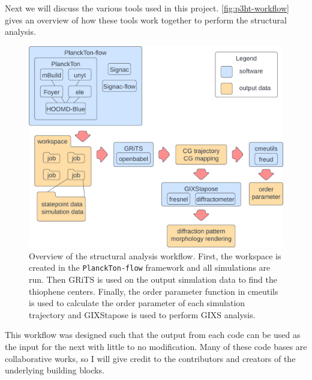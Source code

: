 Next we will discuss the various tools used in this project.  \autoref{fig:p3ht-workflow} gives an overview of how these tools work together to perform the structural analysis.
\begin{figure}[h!]
    \centering
    \includegraphics[width=0.8\linewidth]{figures/p3ht_val/workflow.png}
    \caption{Overview of the structural analysis workflow. First, the workspace is created in the \texttt{PlanckTon-flow} framework and all simulations are run. Then GRiTS is used on the output simulation data to find the thiophene centers. Finally, the order parameter function in cmeutils is used to calculate the order parameter of each simulation trajectory and GIXStapose is used to perform GIXS analysis.}\label{fig:p3ht-workflow}
\end{figure}
This workflow was designed such that the output from each code can be used as the input for the next with little to no modification. 
Many of these code bases are collaborative works, so I will give credit to the contributors and creators of the underlying building blocks.

